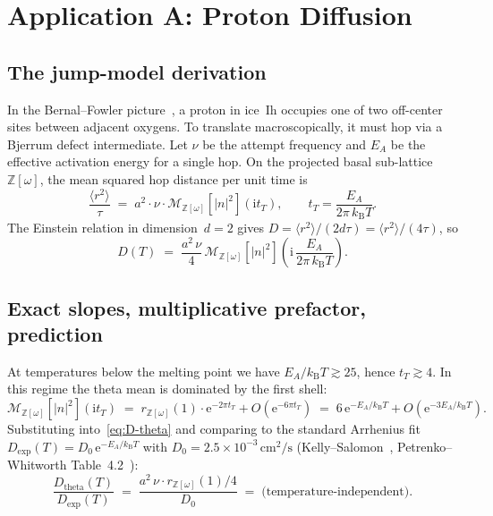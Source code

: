 \documentclass[11pt,letterpaper]{article}
\theoremstyle{plain}
\theoremstyle{definition}
\newcommand{\Eisenstein}{\mathbb{Z}[\omega]}
\newcommand{\tmeaneis}[1]{\mathcal{M}_{\Eisenstein}[#1]}
\newcommand{\e}{\mathrm{e}}
\newcommand{\kB}{k_{\mathrm{B}}}
\begin{document}
\section{Application A: Proton Diffusion}\label{sec:diffusion}

\subsection{The jump-model derivation}

In the Bernal--Fowler picture~\cite{BernalFowler}, a proton in
ice~Ih occupies one of two off-center sites between adjacent oxygens.
To translate macroscopically, it must hop via a Bjerrum defect
intermediate.  Let $\nu$ be the attempt frequency and $E_A$ be the
effective activation energy for a single hop.  On the
projected basal sub-lattice $\Eisenstein$, the mean squared hop
distance per unit time is
\begin{equation}\label{eq:msd}
  \frac{\langle r^2\rangle}{\tau}\;=\;
  a^2\cdot \nu \cdot \tmeaneis{|n|^2}(\mathrm{i} t_T),
  \qquad t_T = \frac{E_A}{2\pi\,\kB T}.
\end{equation}
The Einstein relation in dimension~$d=2$ gives
$D = \langle r^2\rangle/(2d\tau) = \langle r^2\rangle/(4\tau)$, so
\begin{equation}\label{eq:D-theta}
  D(T)\;=\; \frac{a^2\,\nu}{4}\,\tmeaneis{|n|^2}\!\left(\mathrm{i}\,\frac{E_A}{2\pi\,\kB T}\right).
\end{equation}

\subsection{Exact slopes, multiplicative prefactor, prediction}

At temperatures below the melting point we have
$E_A/\kB T \gtrsim 25$, hence $t_T \gtrsim 4$.  In this regime the
theta mean is dominated by the first shell:
\begin{equation}\label{eq:lowT-M}
  \tmeaneis{|n|^2}(\mathrm{i} t_T)\;=\;
  r_{\Eisenstein}(1)\cdot \e^{-2\pi t_T} + O(\e^{-6\pi t_T})
  \;=\; 6\,\e^{-E_A/\kB T} + O(\e^{-3E_A/\kB T}).
\end{equation}
Substituting into~\eqref{eq:D-theta} and comparing to the standard
Arrhenius fit $D_{\text{exp}}(T) = D_0\,\e^{-E_A/\kB T}$ with
$D_0 = 2.5\times 10^{-3}\,\text{cm}^2/\text{s}$
(Kelly--Salomon~\cite{KellySalomon}, Petrenko--Whitworth
Table~4.2~\cite{PetrenkoWhitworth}):
\begin{equation}\label{eq:D-ratio}
  \frac{D_{\text{theta}}(T)}{D_{\text{exp}}(T)}
    \;=\; \frac{a^2\,\nu\cdot r_{\Eisenstein}(1) / 4}{D_0}
    \;=\; \text{(temperature-independent)}.
\end{equation}
\end{document}
